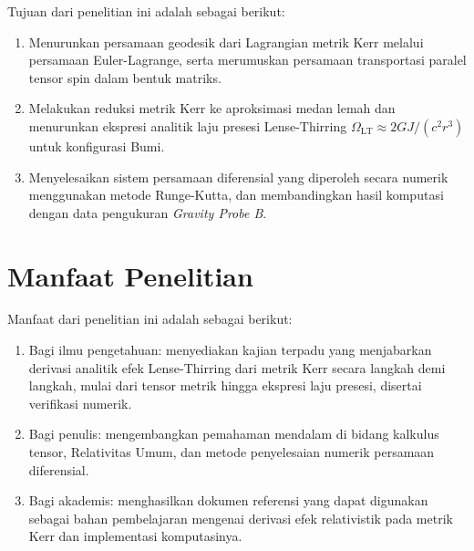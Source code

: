 Tujuan dari penelitian ini adalah sebagai berikut:
\begin{enumerate}[label=\arabic*)]
    \item Menurunkan persamaan geodesik dari Lagrangian metrik Kerr melalui persamaan Euler-Lagrange, serta merumuskan persamaan transportasi paralel tensor spin dalam bentuk matriks.
    \item Melakukan reduksi metrik Kerr ke aproksimasi medan lemah dan menurunkan ekspresi analitik laju presesi Lense-Thirring $\Omega_{\text{LT}} \approx 2GJ/(c^2 r^3)$ untuk konfigurasi Bumi.
    \item Menyelesaikan sistem persamaan diferensial yang diperoleh secara numerik menggunakan metode Runge-Kutta, dan membandingkan hasil komputasi dengan data pengukuran \textit{Gravity Probe B}.
\end{enumerate}

\section{Manfaat Penelitian}
\label{sec:manfaat-penelitian}

Manfaat dari penelitian ini adalah sebagai berikut:
\begin{enumerate}[label=\arabic*)]
    \item Bagi ilmu pengetahuan: menyediakan kajian terpadu yang menjabarkan derivasi analitik efek Lense-Thirring dari metrik Kerr secara langkah demi langkah, mulai dari tensor metrik hingga ekspresi laju presesi, disertai verifikasi numerik.
    \item Bagi penulis: mengembangkan pemahaman mendalam di bidang kalkulus tensor, Relativitas Umum, dan metode penyelesaian numerik persamaan diferensial.
    \item Bagi akademis: menghasilkan dokumen referensi yang dapat digunakan sebagai bahan pembelajaran mengenai derivasi efek relativistik pada metrik Kerr dan implementasi komputasinya.
\end{enumerate}
